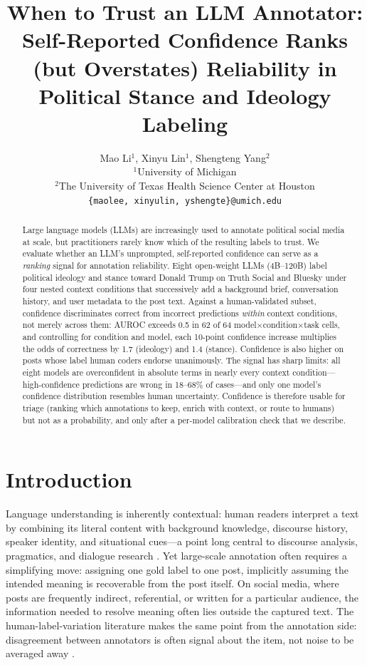 \documentclass[11pt]{article}
\title{When to Trust an LLM Annotator: Self-Reported Confidence Ranks (but Overstates) Reliability in Political Stance and Ideology Labeling}
\author{Mao Li$^{1}$, Xinyu Lin$^{1}$, Shengteng Yang$^{2}$ \\
  $^{1}$University of Michigan \\
  $^{2}$The University of Texas Health Science Center at Houston \\
  \texttt{\{maolee, xinyulin, yshengte\}@umich.edu}}
\begin{document}
\maketitle

\begin{abstract}
Large language models (LLMs) are increasingly used to annotate political social media at scale, but practitioners rarely know which of the resulting labels to trust. We evaluate whether an LLM's unprompted, self-reported confidence can serve as a \emph{ranking} signal for annotation reliability. Eight open-weight LLMs (4B--120B) label political ideology and stance toward Donald Trump on Truth Social and Bluesky under four nested context conditions that successively add a background brief, conversation history, and user metadata to the post text. Against a human-validated subset, confidence discriminates correct from incorrect predictions \emph{within} context conditions, not merely across them: AUROC exceeds 0.5 in 62 of 64 model$\times$condition$\times$task cells, and controlling for condition and model, each 10-point confidence increase multiplies the odds of correctness by 1.7 (ideology) and 1.4 (stance). Confidence is also higher on posts whose label human coders endorse unanimously. The signal has sharp limits: all eight models are overconfident in absolute terms in nearly every context condition---high-confidence predictions are wrong in 18--68\% of cases---and only one model's confidence distribution resembles human uncertainty. Confidence is therefore usable for triage (ranking which annotations to keep, enrich with context, or route to humans) but not as a probability, and only after a per-model calibration check that we describe.
\end{abstract}

\section{Introduction}
Language understanding is inherently contextual: human readers interpret a text by combining its literal content with background knowledge, discourse history, speaker identity, and situational cues---a point long central to discourse analysis, pragmatics, and dialogue research \cite{clark_using_2005, grosz_centering_1995, stalnaker_common_2002, bransford_contextual_1972}. Yet large-scale annotation often requires a simplifying move: assigning one gold label to one post, implicitly assuming the intended meaning is recoverable from the post itself. On social media, where posts are frequently indirect, referential, or written for a particular audience, the information needed to resolve meaning often lies outside the captured text. The human-label-variation literature makes the same point from the annotation side: disagreement between annotators is often signal about the item, not noise to be averaged away \cite{aroyo_truth_2015, pavlick_inherent_2019, plank_problem_2022}.
\end{document}
